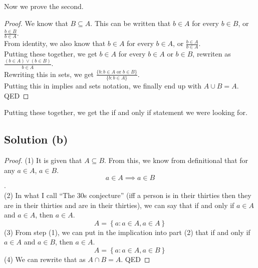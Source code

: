 \documentclass[12pt]{report}
\begin{document}
Now we prove the second.
\begin{proof}
    We know that $B \subseteq A$.
    This can be written that $b \in A$ for every $b \in B$, or $\frac{b \in B}{b \in A}$.\\
    From identity, we also know that $b \in A$ for every $b \in A$, or $\frac{b \in A}{b \in A}$.\\
    Putting these together, we get $b \in A$ for every $b \in A$ or $b \in B$, rewriten as $\frac{(b \in A) \vee (b \in B)}{b \in A}$.\\
    Rewriting this in sets, we get $\frac{\{b : b \in A \text{ or } b \in B\}}{\{b: b \in A\}}$.\\
    Putting this in implies and sets notation, we finally end up with \(A \cup B = A\). \\
    QED
\end{proof}
Putting these together, we get the if and only if statement we were looking for. 

\subsection{Solution (b)}
\begin{proof}
    (1) It is given that $A \subseteq B$. 
    From this, we know from definitional that for any $a \in A$, $a \in B$.
    \[a \in A \implies a \in B\].\\
    (2) In what I call ``The 30s conjecture'' (iff a person is in their thirties then they are in their thirties and are in their thirties), we can say that if and only if $a \in A$ and $a \in A$, then $a \in A$.
    \[A = \left\{a: a \in A, a \in A\right\}\]
    (3) From step (1), we can put in the implication into part (2) that if and only if $a \in A$ and $a \in B$, then $a \in A$.
    \[A = \left\{a: a \in A, a \in B\right\}\]
    (4) We can rewrite that as $A \cap B = A$.
    QED
\end{proof}
\end{document}
